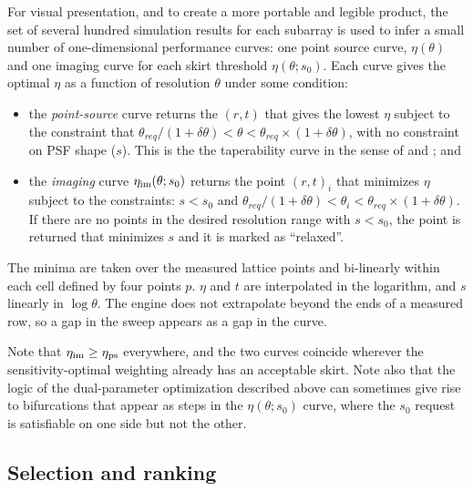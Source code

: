\documentclass[11pt]{article}
\begin{document}
For visual presentation, and to create a more portable and legible
product, the set of several hundred simulation results for each
subarray is used to infer a small number of one-dimensional
performance curves: one point source curve, $\eta(\theta)$ and one imaging curve for
each skirt threshold $\eta(\theta;s_0)$.  Each curve gives the optimal $\eta$ as a
function of resolution $\theta$ under some condition:
\begin{itemize}
\item the {\it point-source} curve returns the $(r,t)$
  that gives the lowest $\eta$ subject to the constraint
  that $\theta_{req}/(1+\delta \theta) < \theta < \theta_{req} \times (1+\delta \theta)$, with
  no constraint on PSF shape ($s$).
  This is the the taperability curve
  in the sense of \citep{memo55} and \citep{memo72}; and
\item the {\it imaging} curve 
  $\eta_{\rm im}(\theta; s_0)$ returns the point $(r,t)_i$ that
  minimizes $\eta$ subject to the constraints: $s < s_0$ and 
$ \theta_{req}/(1+\delta \theta) < \theta_i <  \theta_{req} \times (1+\delta \theta)$.
  If there are no points in the desired resolution range with $s < s_0$,  
  the point is returned that minimizes $s$ and
  it is marked as ``relaxed''.  
\end{itemize}
The minima are taken over the measured lattice points and bi-linearly
within each cell defined by four points $p$. $\eta$ and $t$ are
interpolated in the logarithm, and $s$ linearly in $\log\theta$.  The
engine does not extrapolate beyond the ends of a measured row, so a
gap in the sweep appears as a gap in the curve.

Note that $\eta_{\rm im} \ge \eta_{\rm ps}$ everywhere, and the two
curves coincide wherever the sensitivity-optimal weighting already has
an acceptable skirt. Note also that the logic of the dual-parameter
optimization described above can sometimes give rise to bifurcations
that appear as steps in the  $\eta(\theta;s_0)$ curve, where the $s_0$
request is satisfiable on one side but not the other.

\subsection{Selection and ranking}
\label{sec:selection}
\end{document}
